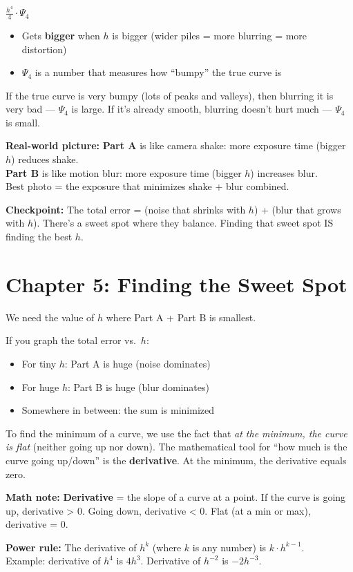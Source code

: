 \documentclass[12pt]{article}
\newcommand{\concept}[2]{\begin{tcolorbox}[colback=blue!3,colframe=blue!40!black,title={#1},breakable]#2\end{tcolorbox}}
\newcommand{\realworld}[1]{\begin{tcolorbox}[colback=green!5,colframe=green!50!black,breakable]\textbf{Real-world picture:} #1\end{tcolorbox}}
\newcommand{\mathnote}[1]{\begin{tcolorbox}[colback=yellow!5,colframe=yellow!60!black,breakable]\textbf{Math note:} #1\end{tcolorbox}}
\newcommand{\checkpoint}[1]{\begin{tcolorbox}[colback=purple!5,colframe=purple!50!black,breakable]\textbf{Checkpoint:} #1\end{tcolorbox}}
\begin{document}
\concept{Part B: The ``blur'' (bias squared)}{
$\frac{h^4}{4} \cdot \Psi_4$

\begin{itemize}
\item Gets \textbf{bigger} when $h$ is bigger (wider piles = more blurring = more distortion)
\item $\Psi_4$ is a number that measures how ``bumpy'' the true curve is
\end{itemize}

If the true curve is very bumpy (lots of peaks and valleys), then blurring it is very bad --- $\Psi_4$ is large. If it's already smooth, blurring doesn't hurt much --- $\Psi_4$ is small.
}

\realworld{
\textbf{Part A} is like camera shake: more exposure time (bigger $h$) reduces shake.\\
\textbf{Part B} is like motion blur: more exposure time (bigger $h$) increases blur.\\
Best photo = the exposure that minimizes shake + blur combined.
}

\checkpoint{The total error = (noise that shrinks with $h$) + (blur that grows with $h$). There's a sweet spot where they balance. Finding that sweet spot IS finding the best $h$.}

\section{Chapter 5: Finding the Sweet Spot}

\concept{Balancing the two forces}{
We need the value of $h$ where Part A + Part B is smallest.

If you graph the total error vs.\ $h$:
\begin{itemize}
\item For tiny $h$: Part A is huge (noise dominates)
\item For huge $h$: Part B is huge (blur dominates)
\item Somewhere in between: the sum is minimized
\end{itemize}
}

To find the minimum of a curve, we use the fact that \textit{at the minimum, the curve is flat} (neither going up nor down). The mathematical tool for ``how much is the curve going up/down'' is the \textbf{derivative}. At the minimum, the derivative equals zero.

\mathnote{
\textbf{Derivative} = the slope of a curve at a point. If the curve is going up, derivative > 0. Going down, derivative < 0. Flat (at a min or max), derivative = 0.

\textbf{Power rule:} The derivative of $h^k$ (where $k$ is any number) is $k \cdot h^{k-1}$.\\
Example: derivative of $h^4$ is $4h^3$. Derivative of $h^{-2}$ is $-2h^{-3}$.
}
\end{document}
